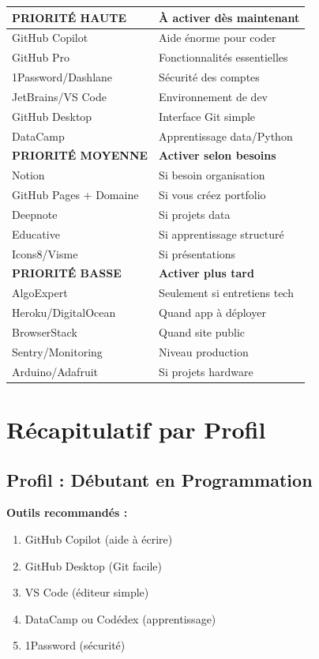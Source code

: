 \documentclass[11pt,a4paper]{article}
\begin{document}
\begin{table}[h!]
\centering
\renewcommand{\arraystretch}{1.3}
\begin{tabularx}{\textwidth}{|l|X|}
\hline
\rowcolor{fondjaune}
\textbf{PRIORITÉ HAUTE} & \textbf{À activer dès maintenant} \\
\hline
GitHub Copilot & Aide énorme pour coder \\
GitHub Pro & Fonctionnalités essentielles \\
1Password/Dashlane & Sécurité des comptes \\
JetBrains/VS Code & Environnement de dev \\
GitHub Desktop & Interface Git simple \\
DataCamp & Apprentissage data/Python \\
\hline
\rowcolor{fondvert}
\textbf{PRIORITÉ MOYENNE} & \textbf{Activer selon besoins} \\
\hline
Notion & Si besoin organisation \\
GitHub Pages + Domaine & Si vous créez portfolio \\
Deepnote & Si projets data \\
Educative & Si apprentissage structuré \\
Icons8/Visme & Si présentations \\
\hline
\rowcolor{fondbleu}
\textbf{PRIORITÉ BASSE} & \textbf{Activer plus tard} \\
\hline
AlgoExpert & Seulement si entretiens tech \\
Heroku/DigitalOcean & Quand app à déployer \\
BrowserStack & Quand site public \\
Sentry/Monitoring & Niveau production \\
Arduino/Adafruit & Si projets hardware \\
\hline
\end{tabularx}
\end{table}

\newpage
\section{Récapitulatif par Profil}

\subsection{Profil : Débutant en Programmation}

\textbf{Outils recommandés :}
\begin{enumerate}
    \item GitHub Copilot (aide à écrire)
    \item GitHub Desktop (Git facile)
    \item VS Code (éditeur simple)
    \item DataCamp ou Codédex (apprentissage)
    \item 1Password (sécurité)
\end{enumerate}
\end{document}
